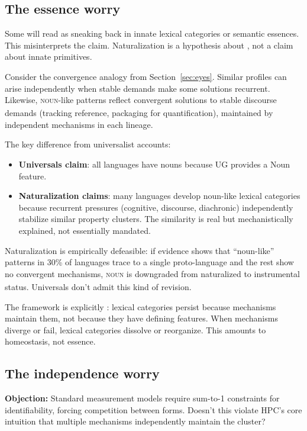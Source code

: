 \documentclass[12pt]{article}
\begin{document}
\subsection{The essence worry}\label{subsec:essence}

Some will read  as sneaking back in innate lexical categories or semantic essences. This misinterprets the claim. Naturalization is a hypothesis about , not a claim about innate primitives.

Consider the convergence analogy from Section~\ref{sec:eyes}. Similar profiles can arise independently when stable demands make some solutions recurrent. Likewise, \textsc{noun}\textsubscript{\Cross}-like patterns reflect convergent solutions to stable discourse demands (tracking reference, packaging for quantification), maintained by independent mechanisms in each lineage.

The key difference from universalist accounts:
\begin{itemize}
\item \textbf{Universals claim}: all languages have nouns because UG provides a Noun feature.
\item \textbf{Naturalization claims}: many languages develop noun-like lexical categories because recurrent pressures (cognitive, discourse, diachronic) independently stabilize similar property clusters. The similarity is real but mechanistically explained, not essentially mandated.
\end{itemize}

Naturalization is empirically defeasible: if evidence shows that \enquote{noun-like} patterns in 30\% of languages trace to a single proto-language and the rest show no convergent mechanisms, \textsc{noun}\textsubscript{\Cross} is downgraded from naturalized to instrumental status. Universals don't admit this kind of revision.

The framework is explicitly : lexical categories persist because mechanisms maintain them, not because they have defining features. When mechanisms diverge or fail, lexical categories dissolve or reorganize. This amounts to homeostasis, not essence.

\subsection{The independence worry}\label{subsec:independence-worry}

\textbf{Objection:} Standard measurement models require sum-to-1 constraints for identifiability, forcing competition between forms. Doesn't this violate HPC's core intuition that multiple mechanisms independently maintain the cluster?
\end{document}
